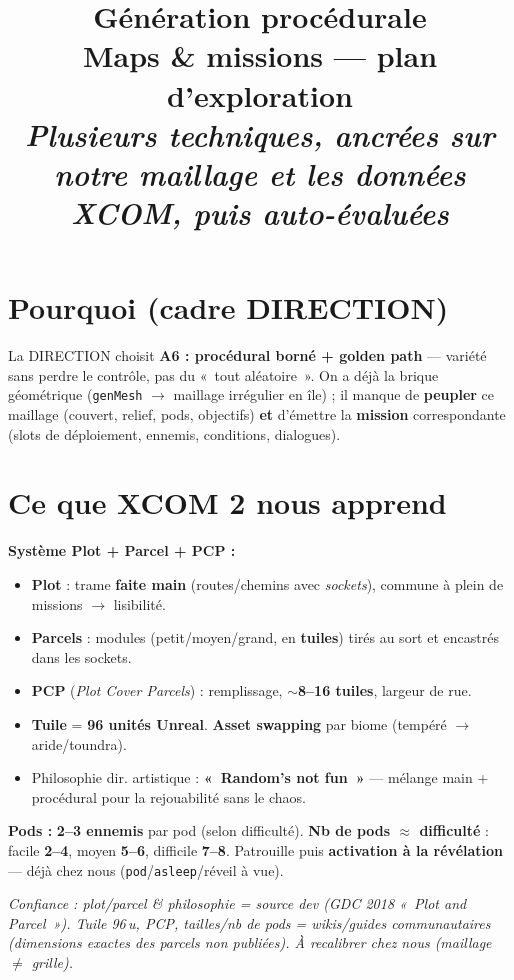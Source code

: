 \documentclass[11pt,a4paper]{article}
\title{\vspace{-1.5em}\textbf{\color{ink}\Huge Génération procédurale}\\[0.3em]
\large\color{accent}Maps \& missions --- plan d'exploration\\[0.2em]
\normalsize\color{ink}\itshape Plusieurs techniques, ancrées sur notre maillage et les données XCOM, puis auto-évaluées}
\author{}\date{}
\begin{document}
\maketitle\vspace{-3em}

\section{Pourquoi (cadre DIRECTION)}
La DIRECTION choisit \textbf{A6 : procédural borné + golden path} --- variété sans perdre le contrôle, pas du «~tout aléatoire~». On a déjà la brique géométrique (\texttt{genMesh} $\to$ maillage irrégulier en île) ; il manque de \textbf{peupler} ce maillage (couvert, relief, pods, objectifs) \textbf{et} d'émettre la \textbf{mission} correspondante (slots de déploiement, ennemis, conditions, dialogues).

\section{Ce que XCOM 2 nous apprend}
\begin{databox}
\textbf{Système Plot + Parcel + PCP :}
\begin{itemize}
\item \textbf{Plot} : trame \textbf{faite main} (routes/chemins avec \emph{sockets}), commune à plein de missions $\to$ lisibilité.
\item \textbf{Parcels} : modules (petit/moyen/grand, en \textbf{tuiles}) tirés au sort et encastrés dans les sockets.
\item \textbf{PCP} (\emph{Plot Cover Parcels}) : remplissage, \textbf{$\sim$8--16 tuiles}, largeur de rue.
\item \textbf{Tuile} = \textbf{96 unités Unreal}. \textbf{Asset swapping} par biome (tempéré $\to$ aride/toundra).
\item Philosophie dir. artistique : \textbf{«~Random's not fun~»} --- mélange main + procédural pour la rejouabilité sans le chaos.
\end{itemize}
\textbf{Pods :} \textbf{2--3 ennemis} par pod (selon difficulté). \textbf{Nb de pods $\approx$ difficulté} : facile \textbf{2--4}, moyen \textbf{5--6}, difficile \textbf{7--8}. Patrouille puis \textbf{activation à la révélation} --- déjà chez nous (\texttt{pod}/\texttt{asleep}/réveil à vue).
\end{databox}
\noindent\emph{Confiance : plot/parcel \& philosophie = source dev (GDC 2018 «~Plot and Parcel~»). Tuile 96\,u, PCP, tailles/nb de pods = wikis/guides communautaires (dimensions exactes des parcels non publiées). À recalibrer chez nous (maillage $\neq$ grille).}
\end{document}
